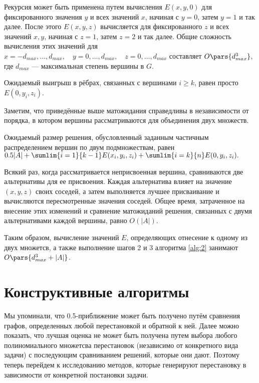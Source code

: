 \documentclass[a4paper, 12pt, oneside]{extarticle}  %
\begin{document}
Рекурсия может быть применена путем вычисления $E(x, y, 0)$ для фиксированного значения $y$ и всех значений $x$, начиная с $y = 0$, затем $y = 1$ и так далее. После этого $E(x, y, z)$ вычисляется для фиксированного $z$ и всех значений $x,y$, начиная с $z = 1$, затем $z = 2$ и так далее. Общие сложность вычисления этих
значений для $x=-d_{max},\ldots,d_{max},\quad y = 0,\ldots,d_{max}, \quad z=0,\ldots,d_{max}$ составляет $O\pars{d_{max}^3}$, где $d_{max}$ --- максимальная степень вершины в $G$.

Ожидаемый выигрыш в рёбрах, связанных с вершинами $i \ge k$, равен просто $E(0, y_i, z_i)$.

Заметим, что приведённые выше матожидания справедливы в независимости от порядка, в котором вершины рассматриваются для объединения двух множеств.

Ожидаемый размер решения, обусловленный заданным частичным распределением вершин по двум подмножествам, равен $0.5|A| + \sumlim{i=1}{k-1}E(x_i,y_i,z_i) + \sumlim{i=k}{n}E(0, y_i, z_i).$

Всякий раз, когда рассматривается неприсвоенная вершина, сравниваются две альтернативы для ее присвоения. Каждая альтернатива влияет на значение $(x, y, z)$ своих соседей, а затем выполняется лучшее присваивание и вычисляются пересмотренные значения соседей. Общее время, затраченное на внесение этих изменений и сравнение
матожиданий решения, связанных с двумя альтернативами каждой вершины, равно $O(|A|)$.

Таким образом, вычисление значений $E$, определяющих отнесение к одному из двух множетсв, а также выполнение шагов 2 и 3 алгоритма \ref{alg:2} занимают $O\pars{d_{max}^3 + |A|}$.


\section{Конструктивные алгоритмы}

Мы упоминали, что 0.5-приближение может быть получено путём сравнения графов, определенных любой перестановкой и обратной к ней. Далее можно показать, что лучшая оценка не может быть получена путем выбора любого полиномиального множетсва перестановок (независимо от конкретного вида задачи) с последующим сравниванием решений, которые они дают. Поэтому теперь перейдем к исследованию методов, которые генерируют перестановку в зависимости от конкретной постановки задачи.
\end{document}
